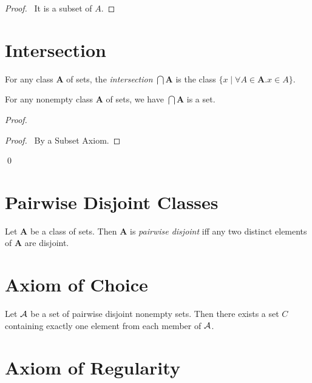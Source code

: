 \begin{proof}
    \pf\ It is a subset of $A$.
\end{proof}

\section{Intersection}

\begin{definition}[Intersection]
    For any class $\mathbf{A}$ of sets, the \emph{intersection}
    $\bigcap \mathbf{A}$ is the class $\{ x \mid \forall A \in \mathbf{A}. x \in A \}$.
\end{definition}

\begin{theorem}
    For any nonempty class $\mathbf{A}$ of sets, we have $\bigcap \mathbf{A}$
    is a set.
\end{theorem}

\begin{proof}
    \pf
    \qedstep
    \begin{proof}
        \pf\ By a Subset Axiom.
    \end{proof}
    \qed
\end{proof}

\section{Pairwise Disjoint Classes}

\begin{definition}
    Let $\mathbf{A}$ be a class of sets. Then $\mathbf{A}$ is \emph{pairwise disjoint}
    iff any two distinct elements of $\mathbf{A}$ are disjoint.
\end{definition}

\section{Axiom of Choice}

\begin{axiom}
    Let $\AA$ be a set of pairwise disjoint nonempty sets. Then there exists a set
    $C$ containing exactly one element from each member of $\AA$.
\end{axiom}

\section{Axiom of Regularity}

